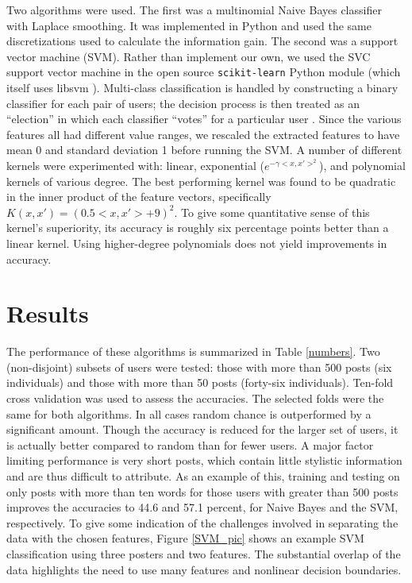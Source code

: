 \documentclass[12pt,letterpaper,onecolumn,oneside]{article}
\numberwithin{equation}{section}
\numberwithin{figure}{section}
\begin{document}
Two algorithms were used. The first was a multinomial Naive Bayes classifier with Laplace smoothing. It was implemented in Python and used the same discretizations used to calculate the information gain. The second was 
a support vector machine (SVM). Rather than implement our own, we used the SVC support vector machine in the open source \verb+scikit-learn+ \cite{scikit-learn} Python module (which itself uses libsvm \cite{libsvm}). 
Multi-class classification is handled by constructing a binary classifier for each pair of users; the decision process is then treated as an ``election'' in which each classifier ``votes'' for a particular user 
\cite{libsvm}. Since the various features all had different value ranges, we rescaled the extracted features to have mean 0 and standard deviation 1 before running the SVM. A number of different kernels were 
experimented with: linear, exponential (\(e^{-\gamma <x,x'>^2}\)), and polynomial kernels of various degree. The best performing kernel was found to be quadratic in the inner product of the feature vectors, specifically 
\(K(x,x') = (0.5<x,x'>+9)^2\). To give some quantitative sense of this kernel's superiority, its accuracy is roughly six percentage points better than a linear kernel. Using higher-degree polynomials does not yield 
improvements in accuracy.

\section{Results}
The performance of these algorithms is summarized in Table \ref{numbers}. Two (non-disjoint) subsets of users were tested: those with more than 500 posts (six individuals) and those with more than 50 posts 
(forty-six individuals). Ten-fold cross validation was used to assess the accuracies. The selected folds were the same for both algorithms. In all cases random chance is outperformed by a significant amount. 
Though the accuracy is reduced for the larger set of users, it is actually better compared to random than for fewer users. A major factor limiting performance is very short posts, which contain little stylistic 
information and are thus difficult to attribute. As an example of this, training and testing on only posts with more than ten words for those users with greater than 500 posts improves the accuracies to 
44.6 and 57.1 percent, for Naive Bayes and the SVM, respectively. To give some indication of the challenges involved in separating the data with the chosen features, Figure \ref{SVM_pic} shows an example SVM 
classification using three posters and two features. The substantial overlap of the data highlights the need to use many features and nonlinear decision boundaries.
\end{document}
